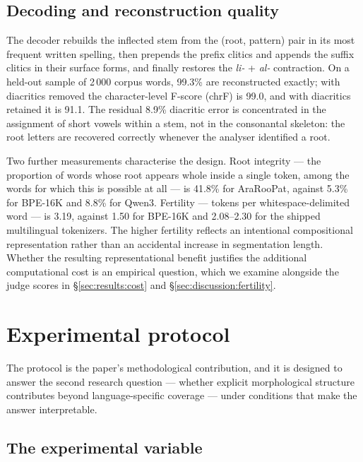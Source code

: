 \documentclass[a4paper,fleqn]{cas-sc}
\begin{document}
\subsection{Decoding and reconstruction quality}
\label{sec:tokenizer:decoding}

The decoder rebuilds the inflected stem from the (root, pattern) pair in its most frequent written spelling, then prepends the prefix clitics and appends the suffix clitics in their surface forms, and finally restores the \emph{li-} + \emph{al-} contraction. On a held-out sample of 2\,000 corpus words, 99.3\% are reconstructed exactly; with diacritics removed the character-level F-score (chrF) is 99.0, and with diacritics retained it is 91.1. The residual 8.9\% diacritic error is concentrated in the assignment of short vowels within a stem, not in the consonantal skeleton: the root letters are recovered correctly whenever the analyser identified a root.

Two further measurements characterise the design. Root integrity --- the proportion of words whose root appears whole inside a single token, among the words for which this is possible at all --- is 41.8\% for AraRooPat, against 5.3\% for BPE-16K and 8.8\% for Qwen3. Fertility --- tokens per whitespace-delimited word --- is 3.19, against 1.50 for BPE-16K and 2.08--2.30 for the shipped multilingual tokenizers. The higher fertility reflects an intentional compositional representation rather than an accidental increase in segmentation length. Whether the resulting representational benefit justifies the additional computational cost is an empirical question, which we examine alongside the judge scores in \S\ref{sec:results:cost} and \S\ref{sec:discussion:fertility}.

\section{Experimental protocol}
\label{sec:protocol}

The protocol is the paper's methodological contribution, and it is designed to answer the second research question --- whether explicit morphological structure contributes beyond language-specific coverage --- under conditions that make the answer interpretable.

\subsection{The experimental variable}
\label{sec:protocol:design}
\end{document}
